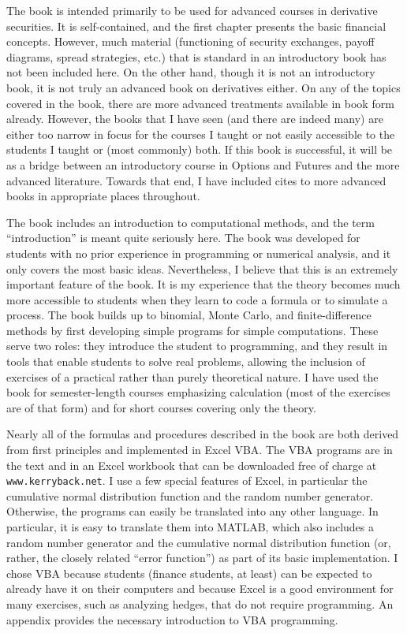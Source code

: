 The book is intended primarily to be used for advanced courses in derivative securities.  It is self-contained, and the first chapter presents the basic financial concepts.  However,  much material (functioning of security exchanges, payoff diagrams, spread strategies, etc.) that is standard in an introductory book has not been included here.  On the other hand, though it is not an introductory book, it is not truly an advanced book on derivatives either.   On any of the topics covered in the book, there are more advanced treatments available in book form already.  However, the books that I have seen (and there are indeed many)  are either too narrow in focus for the courses I taught or not easily accessible to the students I taught or (most commonly) both.  If this book is successful, it will be as a bridge between an introductory course in Options and Futures and the more advanced literature.  Towards that end, I have included cites to more advanced books in appropriate places throughout.

The book includes an introduction to computational methods, and the term ``introduction'' is meant quite seriously here.  The book was developed for students with no prior experience in programming or numerical analysis, and it only covers the most basic ideas.  Nevertheless, I believe that this is an extremely important feature of the book.  It is my experience that the theory becomes much more accessible to students when they  learn to code a formula or to simulate a process. 
The book builds up to binomial, Monte Carlo, and finite-difference methods by first developing simple programs for simple computations.  These serve two roles: they introduce the student to programming, and they result in tools that enable students to  solve real problems, allowing the inclusion of exercises of a practical rather than purely theoretical nature.   I have used the book for  semester-length courses emphasizing calculation (most of the exercises are of that form) and for short courses covering only the theory.  

Nearly all of the formulas and procedures described in the book are both derived from first principles  and implemented in Excel VBA.  The VBA programs are in the text and in an Excel workbook that can be downloaded free of charge at \verb!www.kerryback.net!.  I use a few special features of Excel, in particular the cumulative normal distribution function and the random number generator.  Otherwise, the programs can easily be translated into any other language.  In particular, it is easy to translate them into MATLAB, which also includes a random number generator and the cumulative normal distribution function (or, rather, the closely related ``error function'') as part of its basic implementation.   I chose VBA because students (finance students, at least) can be expected to already have it on their computers and because Excel is a good environment for many exercises, such as analyzing hedges, that do not require programming.  An appendix provides the necessary introduction to VBA programming.  

